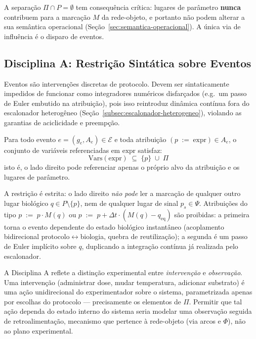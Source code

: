 A separação $\Pi \cap P = \emptyset$ tem consequência crítica: lugares de
parâmetro \textbf{nunca} contribuem para a marcação $M$ da rede-objeto, e
portanto não podem alterar a sua semântica operacional
(Seção~\ref{sec:semantica-operacional}). A única via de influência é o
disparo de eventos.

\subsection{Disciplina A: Restrição Sintática sobre Eventos}
\label{subsec:disciplina-a}

Eventos são intervenções discretas de protocolo. Devem ser sintaticamente
impedidos de funcionar como integradores numéricos disfarçados (e.g.\ um passo
de Euler embutido na atribuição), pois isso reintroduz dinâmica contínua
fora do escalonador heterogêneo (Seção~\ref{subsec:escalonador-heterogeneo}),
violando as garantias de aciclicidade e preempção.

\begin{principle}[Disciplina A]
\label{princ:disciplina-a}
Para todo evento $e = (g_e, A_e) \in \mathcal{E}$ e toda atribuição
$(p \;{:=}\; \text{expr}) \in A_e$, o conjunto de variáveis referenciadas
em $\text{expr}$ satisfaz:
\[
\mathrm{Vars}(\text{expr}) \;\subseteq\; \{p\} \;\cup\; \Pi
\]
isto é, o lado direito pode referenciar apenas o próprio alvo da atribuição
e os lugares de parâmetro.
\end{principle}

A restrição é estrita: o lado direito \emph{não pode} ler a marcação de
qualquer outro lugar biológico $q \in P \setminus \{p\}$, nem de qualquer
lugar de sinal $p_s \in \Psi$. Atribuições do tipo
$p \;{:=}\; p \cdot M(q)$ ou $p \;{:=}\; p + \Delta t \cdot (M(q) - q_{\text{eq}})$
são proibidas: a primeira torna o evento dependente do estado biológico
instantâneo (acoplamento bidirecional protocolo$\leftrightarrow$biologia,
quebra de reutilização); a segunda é um passo de Euler implícito sobre $q$,
duplicando a integração contínua já realizada pelo escalonador.

\begin{remark}
\label{rem:disciplina-a-justificativa}
A Disciplina A reflete a distinção experimental entre \emph{intervenção} e
\emph{observação}. Uma intervenção (administrar dose, mudar temperatura,
adicionar substrato) é uma ação unidirecional do experimentador sobre o
sistema, parametrizada apenas por escolhas do protocolo --- precisamente os
elementos de $\Pi$. Permitir que tal ação dependa do estado interno do
sistema seria modelar uma observação seguida de retroalimentação, mecanismo
que pertence à rede-objeto (via arcos e $\Phi$), não ao plano experimental.
\end{remark}

